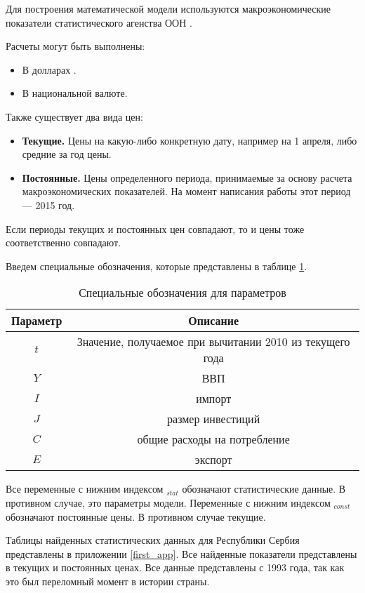 
Для построения математической модели используются макроэкономические показатели статистического агенства ООН \cite{unstat}.

Расчеты могут быть выполнены:
\begin{itemize}
	\item В долларах .
	\item В национальной валюте.
\end{itemize}

Также существует два вида цен:
\begin{itemize}
	\item \textbf{Текущие.}
	Цены на какую-либо конкретную дату, например на 1 апреля, либо средние за год цены.
	\item \textbf{Постоянные.}
	Цены определенного периода, принимаемые за основу расчета макроэкономических показателей.
	На момент написания работы этот период --- 2015 год.
\end{itemize}
Если периоды текущих и постоянных цен совпадают, то и цены тоже соответственно совпадают.

Введем специальные обозначения, которые представлены в таблице \ref{desig_of_params}.

\begin{table}[]
	\centering
	\begin{tabular}{|c|c|}
	\hline
	\multicolumn{1}{|c|}{Параметр} & \multicolumn{1}{c|}{Описание} \\ \hline
	$t$                          &Значение, получаемое при вычитании 2010 из текущего года\\
	$Y$                          & ВВП                                                   \\
	$I$                          & импорт                                                \\
	$J$                          & размер инвестиций                                     \\
	$C$                          & общие расходы на потребление                          \\
	$E$                          & экспорт                                               \\ \hline
\end{tabular}
\caption{Специальные обозначения для параметров}\label{desig_of_params}
\end{table}

Все переменные с нижним индексом $_{stat}$ обозначают статистические данные.
В противном случае, это параметры модели.
Переменные с нижним индексом $_{const}$ обозначают постоянные цены.
В противном случае текущие.

Таблицы найденных статистических данных для Республики Сербия  представлены в приложении \ref{first_app}.
Все найденные показатели представлены в текущих и постоянных ценах.
Все данные представлены с 1993 года, так как это был переломный момент в истории страны.
